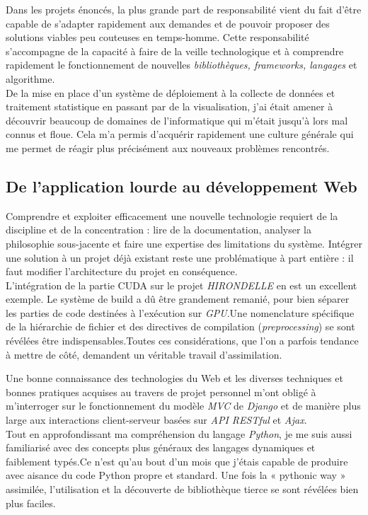 \documentclass[french, 11pt]{memoir}
\begin{document}
Dans les projets énoncés, la plus grande part de responsabilité vient du
fait d'être capable de s'adapter rapidement aux demandes et de pouvoir
proposer des solutions viables peu couteuses en temps-homme. Cette
responsabilité s'accompagne de la capacité à faire de la veille
technologique et à comprendre rapidement le fonctionnement de nouvelles
\emph{bibliothèques, frameworks, langages} et algorithme.\\
De la mise en place d'un système de déploiement à la collecte de données et traitement
statistique en passant par de la visualisation, j'ai était amener à
découvrir beaucoup de domaines de l'informatique qui m'était jusqu'à
lors mal connus et floue. Cela m'a permis d'acquérir rapidement une
culture générale qui me permet de réagir plus précisément aux nouveaux
problèmes rencontrés.

\subsection{De l'application lourde au développement
	Web}\label{de-lapplication-lourde-au-duxe9veloppement-web}

Comprendre et exploiter efficacement une nouvelle technologie requiert
de la discipline et de la concentration : lire de la documentation,
analyser la philosophie sous-jacente et faire une expertise des
limitations du système. Intégrer une solution à un projet déjà existant
reste une problématique à part entière : il faut modifier l'architecture
du projet en conséquence.\\
 L'intégration de la partie CUDA sur le projet
\emph{HIRONDELLE} en est un excellent exemple. Le système de build a dû
être grandement remanié, pour bien séparer les parties de code destinées
à l'exécution sur \emph{GPU}.Une nomenclature spécifique de la
hiérarchie de fichier et des directives de compilation
(\emph{preprocessing}) se sont révélées être indispensables.Toutes ces
considérations, que l'on a parfois tendance à mettre de côté, demandent
un véritable travail d'assimilation.

\bigskip
Une bonne connaissance des
technologies du Web et les diverses techniques et bonnes pratiques
acquises au travers de projet personnel m'ont obligé à m'interroger sur
le fonctionnement du modèle \emph{MVC} de \emph{Django} et de manière
plus large aux interactions client-serveur basées sur \textit{API RESTful} et
\emph{Ajax}. 
\\Tout en approfondissant ma compréhension du langage
\emph{Python}, je me suis aussi familiarisé avec des concepts plus
généraux des langages dynamiques et faiblement typés.Ce n'est qu'au bout
d'un mois que j'étais capable de produire avec aisance du code Python
propre et standard. Une fois la « pythonic way » assimilée,
l'utilisation et la découverte de bibliothèque tierce se sont révélées
bien plus faciles.
\end{document}
